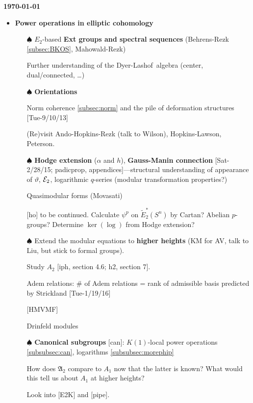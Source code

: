 \documentclass{rs}
\theoremstyle{definition}
\theoremstyle{remark}
\newcommand{\mf}[1]{\mathfrak{#1}}
\newcommand{\CE}{{\cal E}}
\newcommand{\DL}{Dyer-Lashof~}
\newcommand{\A}{\alpha}
\newcommand{\todo}{\spadesuit}
\renewcommand{\=}{\approx}
\renewcommand{\-}{\sim}
\numberwithin{equation}{section}
\numberwithin{thm}{section}
\begin{document}
{\bf \today}

\begin{itemize}
 \item {\bf Power operations in elliptic cohomology} 

 \begin{itemize}
  \item [$\todo$] $E_2$-based \textbf{Ext groups and spectral sequences} (Behrens-Rezk \ref{subsec:BKOS}, Mahowald-Rezk) 

  Further understanding of the \DL algebra (center, dual/connected, \ldots) 

  \item [$\todo$] \textbf{Orientations} 

  Norm coherence \ref{subsec:norm} and the pile of deformation structures [Tue-9/10/13] 

  (Re)visit Ando-Hopkins-Rezk (talk to Wilson), Hopkins-Lawson, Peterson.  

  \item [$\todo$] {\bf Hodge extension} ($\A$ and $h$), {\bf Gauss-Manin connection} 
  [Sat-2/28/15; padicprop, appendices]---structural understanding of appearance of $\vartheta$, $\CE_2$, logarithmic $q$-series (modular transformation properties?) 

  Quasimodular forms (Movasati) 

  [ho] to be continued.  Calculate $\psi^p$ on $\widetilde{E}_2^*(S^n)$ by Cartan?  Abelian $p$-groups?  Determine $\ker(\log)$ from Hodge extension?  

  \item [$\todo$] Extend the modular equations to {\bf higher heights} (KM for AV, talk to Liu, but stick to formal groups).  

  Study $A_2$ [iph, section 4.6; h2, section 7].  

  Adem relations: \# of Adem relations = rank of admissible basis predicted by Strickland [Tue-1/19/16] 

  [HMVMF] 

  Drinfeld modules 

  \item [$\todo$] {\bf Canonical subgroups} [can]: $K(1)$-local power operations \ref{subsubsec:can}, logarithms \ref{subsubsec:morephip} 

  How does $\mf A_2$ compare to $A_1$ now that the latter is known?  
  What would this tell us about $A_1$ at higher heights?  

  Look into [E2K] and [pipe].  


\end{itemize}
\end{itemize}
\end{document}

